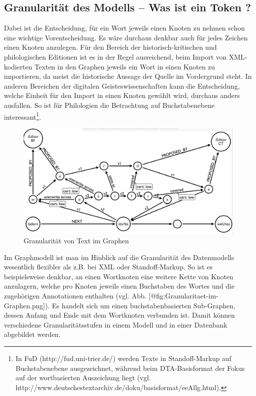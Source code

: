 \documentclass[12pt,ngerman,]{article}
\begin{document}
\subsection{Granularität des Modells -- Was ist ein Token
?}\label{granularituxe4t-des-modells-was-ist-ein-token}

Dabei ist die Entscheidung, für ein Wort jeweils einen Knoten zu nehmen
schon eine wichtige Vorentscheidung. Es wäre durchaus denkbar auch für
jedes Zeichen einen Knoten anzulegen. Für den Bereich der
historisch-kritischen und philologischen Editionen ist es in der Regel
ausreichend, beim Import von XML-kodierten Texten in den Graphen jeweils
ein Wort in einen Knoten zu importieren, da meist die historische
Aussage der Quelle im Vordergrund steht. In anderen Bereichen der
digitalen Geisteswissenschaften kann die Entscheidung, welche Einheit
für den Import in einen Knoten gewählt wird, durchaus anders ausfallen.
So ist für Philologien die Betrachtung auf Buchstabenebene
interessant\footnote{In FuD (http://fud.uni-trier.de/) werden Texte in
  Standoff-Markup auf Buchstabenebene ausgezeichnet, während beim
  DTA-Basisformat der Fokus auf der wortbasierten Auszeichung liegt
  (vgl. http://www.deutschestextarchiv.de/doku/basisformat/eeAllg.html).}.

\begin{figure}
\centering
\includegraphics{Bilder/Granularitaet-im-Graphen.png}
\caption{Granularität von Text im
Graphen}\label{fig:Granularitaet-im-Graphen.png}
\end{figure}

Im Graphmodell ist man im Hinblick auf die Granularität des Datenmodells
wesentlich flexibler als z.B. bei XML oder Standoff-Markup. So ist es
beispielsweise denkbar, an einen Wortknoten eine weitere Kette von
Knoten anzulagern, welche pro Knoten jeweils einen Buchstaben des Wortes
und die zugehörigen Annotationen enthalten (vgl. Abb.
{[}@fig:Granularitaet-im-Graphen.png{]}). Es handelt sich um einen
buchstabenbasierten Sub-Graphen, dessen Anfang und Ende mit dem
Wortknoten verbunden ist. Damit können verschiedene Granularitätsstufen
in einem Modell und in einer Datenbank abgebildet werden.
\end{document}
